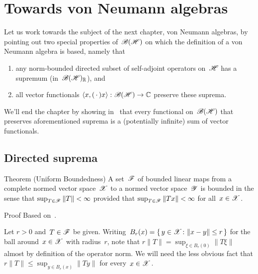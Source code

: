 \documentclass[a]{subfiles}
\begin{document}
\section{Towards von Neumann algebras}
\begin{parsec}%
\begin{point}%
Let us work towards
the subject of the next chapter, von Neumann algebras,
by pointing out two special properties
of~$\mathscr{B}(\mathscr{H})$
on which the definition of a von Neumann algebra is based,
namely that
\begin{enumerate}
\item
any norm-bounded directed subset of
self-adjoint operators on~$\mathscr{H}$
has a supremum (in~$\mathscr{B}(\mathscr{H})_{\mathbb{R}}$), and
\item
all vector functionals
$\left<x,(\,\cdot\,)x\right>\colon \mathscr{B}(\mathscr{H})\to\mathbb{C}$ 
preserve these suprema.
\end{enumerate}
We'll end
the chapter
by showing
in~
 that every  functional on~$\mathscr{B}(\mathscr{H})$
that  preserves aforementioned
suprema
is a (potentially infinite) sum of vector functionals.
\end{point}

\subsection{Directed suprema}
\begin{point}[pub]{Theorem (Uniform Boundedness)}%
A set~$\mathscr{F}$ of bounded linear maps 
from a complete normed vector space~$\mathscr{X}$
to a normed vector space~$\mathscr{Y}$
is bounded
in the sense that $\sup_{T\in \mathscr{F}} \|T\|<\infty$
provided that 
 $\sup_{T\in \mathscr{F}} \|Tx\|<\infty$
 for all~$x\in \mathscr{X}$.
\begin{point}{Proof}%
Based on~\cite{sokal}.
\begin{point}%
Let $r>0$ and~$T\in\mathscr{F}$ be given.
Writing~$B_r(x)=\{\,y\in\mathscr{X}\colon \|x-y\|\leq r\,\}$
for the ball around~$x\in\mathscr{X}$ with radius~$r$,
note that $r\|T\|=\sup_{\xi\in B_r(0)} \|T \xi\|$
almost by definition of the operator norm.
We will need the less obvious fact
that $r\|T\|\leq \sup_{y\in B_r(x)}\|T y\|$
for every~$x\in \mathscr{X}$.


\end{point}
\end{point}
\end{point}
\end{parsec}
\end{document}

